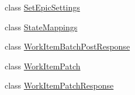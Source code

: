 \begin{DoxyCompactItemize}
class \mbox{\hyperlink{class_vsts_rest_a_p_i_1_1_viewmodel_1_1_work_item_1_1_set_epic_settings}{Set\+Epic\+Settings}}
\item 
class \mbox{\hyperlink{class_vsts_rest_a_p_i_1_1_viewmodel_1_1_work_item_1_1_state_mappings}{State\+Mappings}}
\item 
class \mbox{\hyperlink{class_vsts_rest_a_p_i_1_1_viewmodel_1_1_work_item_1_1_work_item_batch_post_response}{Work\+Item\+Batch\+Post\+Response}}
\item 
class \mbox{\hyperlink{class_vsts_rest_a_p_i_1_1_viewmodel_1_1_work_item_1_1_work_item_patch}{Work\+Item\+Patch}}
\item 
class \mbox{\hyperlink{class_vsts_rest_a_p_i_1_1_viewmodel_1_1_work_item_1_1_work_item_patch_response}{Work\+Item\+Patch\+Response}}
\end{DoxyCompactItemize}
